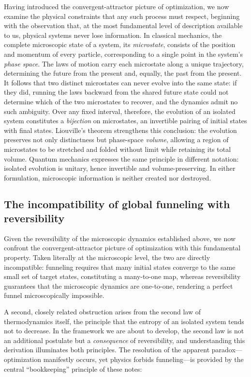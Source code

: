 \documentclass[11pt]{article}
\begin{document}
Having introduced the convergent-attractor picture of optimization, we now examine the physical constraints that any such process must respect, beginning with the observation that, at the most fundamental level of description available to us, physical systems never lose information. In classical mechanics, the complete microscopic state of a system, its \emph{microstate}, consists of the position and momentum of every particle, corresponding to a single point in the system's \emph{phase space}. The laws of motion carry each microstate along a unique trajectory, determining the future from the present and, equally, the past from the present. It follows that two distinct microstates can never evolve into the same state: if they did, running the laws backward from the shared future state could not determine which of the two microstates to recover, and the dynamics admit no such ambiguity. Over any fixed interval, therefore, the evolution of an isolated system constitutes a \emph{bijection} on microstates, an invertible pairing of initial states with final states. Liouville's theorem strengthens this conclusion: the evolution preserves not only distinctness but phase-space \emph{volume}, allowing a region of microstates to be stretched and folded without limit while retaining its total volume. Quantum mechanics expresses the same principle in different notation: isolated evolution is unitary, hence invertible and volume-preserving. In either formulation, microscopic information is neither created nor destroyed.

\subsection{The incompatibility of global funneling with reversibility}
\label{sec:nofunnel}

Given the reversibility of the microscopic dynamics established above, we now confront the convergent-attractor picture of optimization with this fundamental property. Taken literally at the microscopic level, the two are directly incompatible: funneling requires that many initial states converge to the same small set of target states, constituting a many-to-one map, whereas reversibility guarantees that the microscopic dynamics are one-to-one, rendering a perfect funnel microscopically impossible.

A second, closely related obstruction arises from the second law of thermodynamics itself, the principle that the entropy of an isolated system tends not to decrease. In the framework we are about to develop, the second law is not an additional postulate but a \emph{consequence} of reversibility, and understanding this derivation illuminates both principles. The resolution of the apparent paradox---optimization manifestly occurs, yet physics forbids funneling---is provided by the central ``bookkeeping'' principle of these notes:
\end{document}
